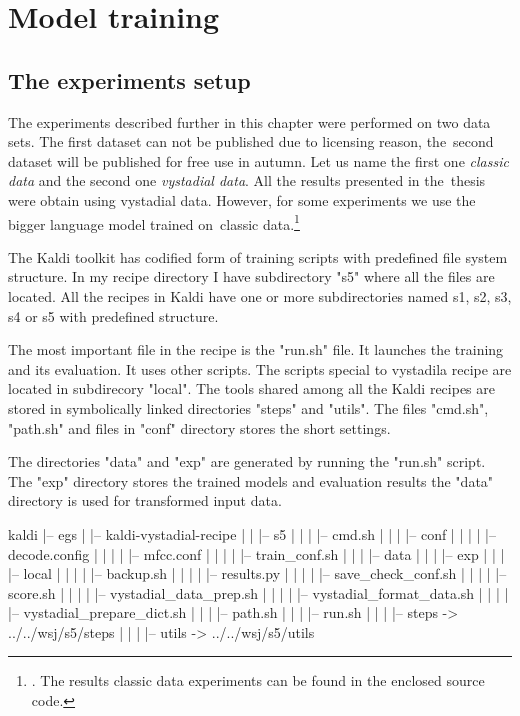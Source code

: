 \chapter{Model training}
\label{cha:training}


\section{The experiments setup} 
\label{sec:the_experiments_setup}

The experiments described further in this chapter were performed on two data sets.
The first dataset can not be published due to licensing reason, 
the~second dataset will be published for free use in autumn.
Let us name the first one {\it classic data} and the second one {\it vystadial data}.
All the results presented in the~thesis were obtain using vystadial data.
However, for some experiments we use the bigger language model trained 
on~classic data.\footnote{. The results classic data experiments 
can be found in the enclosed source code.}

\small{The Kaldi toolkit has codified form of training scripts with predefined file system structure. 
In my recipe directory I have subdirectory "s5" where all the files are located. All the recipes in Kaldi have 
 one or more subdirectories named s1, s2, s3, s4 or s5 with predefined structure.

The most important file in the recipe is the "run.sh" file. It launches the training and its evaluation.
It uses other scripts. The scripts special to vystadila recipe are located in subdirecory "local".
The tools shared among all the Kaldi recipes are stored in symbolically linked directories "steps" and "utils".
The files "cmd.sh", "path.sh" and files in "conf" directory stores the short settings.

The directories "data" and "exp" are generated by running the "run.sh" script.
The "exp" directory stores the trained models and evaluation results the "data" 
directory is used for transformed input data.}

\tiny\begin{verbbox}
kaldi
|-- egs
|   |-- kaldi-vystadial-recipe
|   |   |-- s5
|   |   |   |-- cmd.sh
|   |   |   |-- conf
|   |   |   |   |-- decode.config
|   |   |   |   |-- mfcc.conf
|   |   |   |   |-- train_conf.sh
|   |   |   |-- data
|   |   |   |-- exp
|   |   |   |-- local
|   |   |   |   |-- backup.sh
|   |   |   |   |-- results.py
|   |   |   |   |-- save_check_conf.sh
|   |   |   |   |-- score.sh
|   |   |   |   |-- vystadial_data_prep.sh
|   |   |   |   |-- vystadial_format_data.sh
|   |   |   |   |-- vystadial_prepare_dict.sh
|   |   |   |-- path.sh
|   |   |   |-- run.sh
|   |   |   |-- steps -> ../../wsj/s5/steps
|   |   |   |-- utils -> ../../wsj/s5/utils
\end{verbbox}
\normalsize

